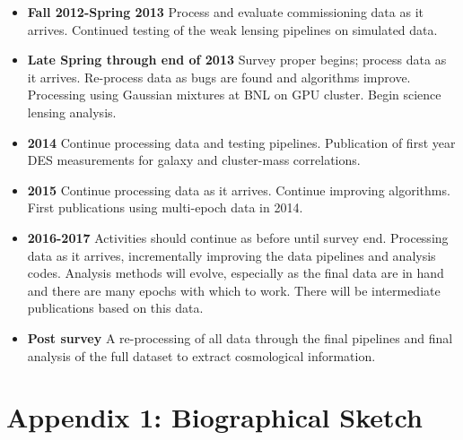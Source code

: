 \documentclass[12pt]{article}
\begin{document}
\begin{itemize}

\item {\bf Fall 2012-Spring 2013} Process and evaluate commissioning data as it
    arrives.  Continued testing of the weak lensing pipelines on simulated
    data.

\item {\bf Late Spring through end of 2013} Survey proper begins; process data
    as it arrives.  Re-process data as bugs are found and algorithms improve.
    Processing using Gaussian mixtures at BNL on GPU cluster.  Begin science
    lensing analysis.

\item {\bf 2014} Continue processing data and testing pipelines.  Publication
    of first year DES measurements for galaxy and cluster-mass correlations.

\item {\bf 2015} Continue processing data as it arrives.  Continue improving
    algorithms.   First publications using multi-epoch data in 2014.

\item {\bf 2016-2017}  Activities should continue as before until survey end.
    Processing data as it arrives, incrementally improving the data pipelines
    and analysis codes.  Analysis methods will evolve, especially as the final
    data are in hand and there are many epochs with which to work.   There will
    be intermediate publications based on this data.

\item {\bf Post survey} A re-processing of all data through the final pipelines
    and final analysis of the full dataset to extract cosmological information.


\end{itemize}







\newpage
{}
\section*{Appendix 1: Biographical Sketch}


\newcommand{\tsp}{\vspace{0.1cm}}
\newcommand{\isp}{\vspace{0.3cm}}
\newcommand{\ssp}{\vspace{0.4cm}}
\end{document}
